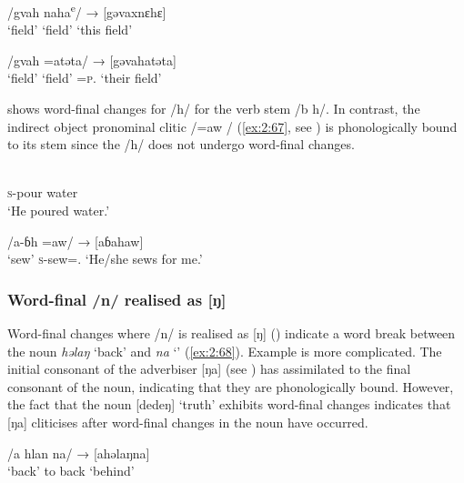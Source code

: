 \ea \label{ex:2:64}
\gll       {[gəvax]}  {\ExampleSpace}   {/gvah}     {naha\textsuperscript{e}/}  {→}  {[gəvaxnɛhɛ]}\\
       {‘field’}   {}  {‘field’}    {\DEM}    { }        {‘this field’}\\
\z

\ea \label{ex:2:65}
\gll [gəvax]  {\ExampleSpace}  /gvah     =atəta/  →  [gəvahatəta]\\
     ‘field’    {}  ‘field’  =\textsc{p}.{\POSS} {} {‘their field’}    \\
\z

 shows word-final changes for /h/ for the verb stem /b h/. In contrast, the {\oneS} indirect object pronominal clitic /=aw / (\ref{ex:2:67}, see ) is phonologically bound to its stem since the /h/ does not undergo word-final changes.

\ea \label{ex:2:66}
\\
      \textsc{s}-pour  water\\
\glt  ‘He poured water.'
\z

\ea \label{ex:2:67}
\gll [ɓax] {\ExampleSpace} {/a-ɓh  =aw/}  {→}  [aɓahaw]\\
     ‘sew’  {}  \textsc{s}-sew={\oneS}.{\IO}  {}   {‘He/she sews for me.’}\\
\z

\subsubsection{Word-final /n/ realised as [ŋ]}\label{sec:2.6.1.2}

Word-final changes where /n/ is realised as [ŋ] (\citealt{Bow1997c}) indicate a word break between the noun \textit{həlaŋ} ‘back’ and \textit{na} ‘\PSP' (\ref{ex:2:68}). Example  is more complicated. The initial consonant of the adverbiser [ŋa] (see ) has assimilated to the final consonant of the noun, indicating that they are phonologically bound. However, the fact that the noun [dedeŋ] ‘truth’ exhibits  word-final changes indicates that [ŋa] cliticises after word-final changes in the noun have occurred. 

\ea \label{ex:2:68}
\gll [həlaŋ]  {\ExampleSpace}  /a  hlan     na/ \hspace{8pt} →\hspace{5pt} [ahəlaŋna]\\
      ‘back’  {}   to  back    {\PSP} {}  {}   ‘behind’ \\
\z

